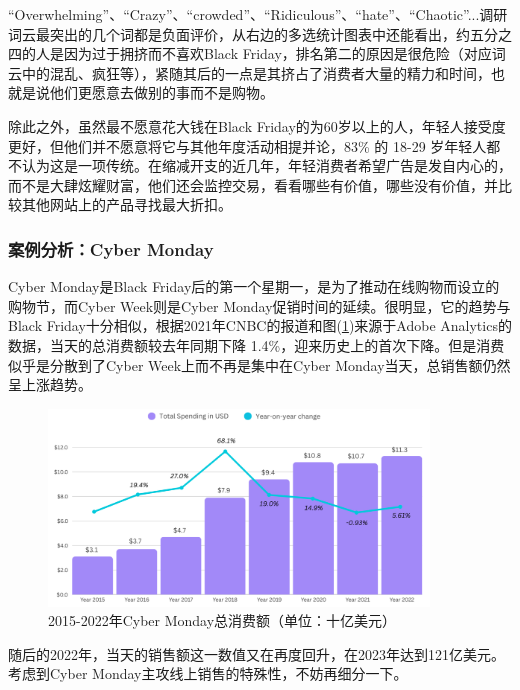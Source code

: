 \documentclass[12pt]{ctexart}
\begin{document}
“Overwhelming”、“Crazy”、“crowded”、“Ridiculous”、“hate”、“Chaotic”...调研词云最突出的几个词都是负面评价，从右边的多选统计图表中还能看出，约五分之四的人是因为过于拥挤而不喜欢Black Friday，排名第二的原因是很危险（对应词云中的混乱、疯狂等），紧随其后的一点是其挤占了消费者大量的精力和时间，也就是说他们更愿意去做别的事而不是购物。

除此之外，虽然最不愿意花大钱在Black Friday的为60岁以上的人，年轻人接受度更好，但他们并不愿意将它与其他年度活动相提并论，83\% 的 18-29 岁年轻人都不认为这是一项传统\cite{6}。在缩减开支的近几年，年轻消费者希望广告是发自内心的，而不是大肆炫耀财富，他们还会监控交易，看看哪些有价值，哪些没有价值，并比较其他网站上的产品寻找最大折扣\cite{8}。

\subsubsection{案例分析：Cyber Monday}
Cyber Monday是Black Friday后的第一个星期一，是为了推动在线购物而设立的购物节，而Cyber Week则是Cyber Monday促销时间的延续。很明显，它的趋势与Black Friday十分相似，根据2021年CNBC的报道\cite{10}和图(\ref{cm})来源于Adobe Analytics的数据，当天的总消费额较去年同期下降 1.4\%，迎来历史上的首次下降。但是消费似乎是分散到了Cyber Week上而不再是集中在Cyber Monday当天，总销售额仍然呈上涨趋势。

\begin{figure}[htbp!]
    \centering
    \includegraphics[width=0.9\textwidth]{Images/6.png}
    \caption{2015-2022年Cyber Monday总消费额（单位：十亿美元）\cite{9}}
    \label{cm}
\end{figure}

随后的2022年，当天的销售额这一数值又在再度回升，在2023年达到121亿美元。考虑到Cyber Monday主攻线上销售的特殊性，不妨再细分一下。
\end{document}
